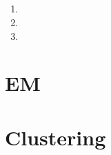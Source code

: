 \documentclass[paper=letter, fontsize=12pt]{article}
\begin{document}
\subsection{}

\begin{enumerate}[label=(\alph*)]
	\item 
	
	\item 
	
	\item 
\end{enumerate}

\section{EM}

\section{Clustering}
\end{document}
